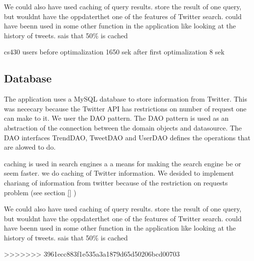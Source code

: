 We could also have used caching of query results. store the result of one query, but wouldnt have the oppdaterthet %
one of the features of Twitter search. could have beenn used in some other function in the application like looking at the history of tweets. \citet{boka kap 11, under caching} sais that 50\% is cached


cs430 users 
before optimalization
1650 sek
after first optimalization
8 sek

\subsection{Database} %
\label{feedJamDatabase}
The application uses a MySQL database to store information from Twitter. This was nececary because the Twitter API has restrictions on number of request one can make to it.
We user the DAO pattern. The DAO pattern is used as an abstraction of the connection between the domain objects and datasource. The DAO interfaces TrendDAO, TweetDAO and UserDAO defines the operations that are alowed to do.  


\citep{boka kap11} caching is used in search engines a a means for making the search engine be or seem faster. we do caching of Twitter information. We desided to implement chariang of information from twitter because of the restriction on requests problem (see section \ref{} \nameref{}) 

We could also have used caching of query results. store the result of one query, but wouldnt have the oppdaterthet %
one of the features of Twitter search. could have beenn used in some other function in the application like looking at the history of tweets. \citet{boka kap 11, under caching} sais that 50\% is cached




>>>>>>> 3961ecc883f1e535a3a1879d65d50206bcd00703
